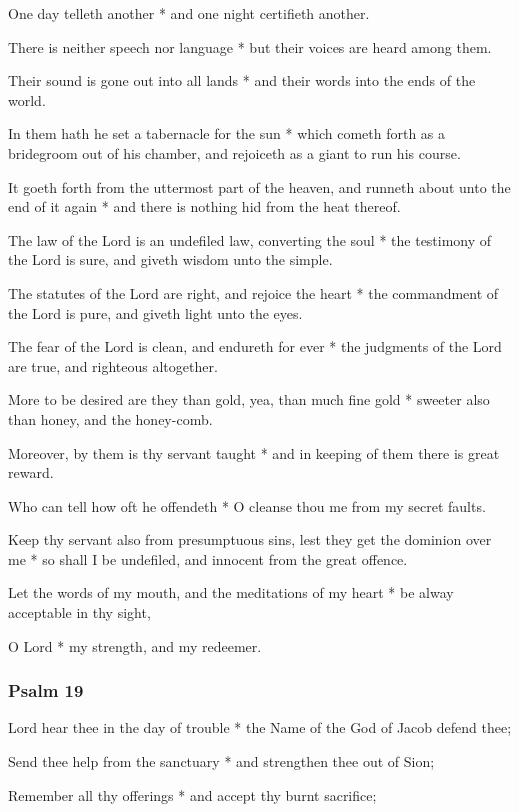 One day telleth another * and one night certifieth another.

There is neither speech nor language * but their voices are heard among them.

Their sound is gone out into all lands * and their words into the ends of the world.

In them hath he set a tabernacle for the sun * which cometh forth as a bridegroom out of his chamber, and rejoiceth as a giant to run his course.

It goeth forth from the uttermost part of the heaven, and runneth about unto the end of it again * and there is nothing hid from the heat thereof.

The law of the Lord is an undefiled law, converting the soul * the testimony of the Lord is sure, and giveth wisdom unto the simple.

The statutes of the Lord are right, and rejoice the heart * the commandment of the Lord is pure, and giveth light unto the eyes.

The fear of the Lord is clean, and endureth for ever * the judgments of the Lord are true, and righteous altogether.

More to be desired are they than gold, yea, than much fine gold * sweeter also than honey, and the honey-comb.

Moreover, by them is thy servant taught * and in keeping of them there is great reward.

Who can tell how oft he offendeth * O cleanse thou me from my secret faults.

Keep thy servant also from presumptuous sins, lest they get the dominion over me * so shall I be undefiled, and innocent from the great offence.

Let the words of my mouth, and the meditations of my heart * be alway acceptable in thy sight,

O Lord * my strength, and my redeemer.

\subsubsection{Psalm 19}


 Lord hear thee in the day of trouble * the Name of the God of Jacob defend thee;

Send thee help from the sanctuary * and strengthen thee out of Sion;

Remember all thy offerings * and accept thy burnt sacrifice;


